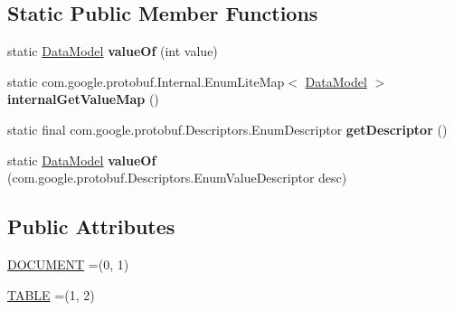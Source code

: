 \subsection*{Static Public Member Functions}
\begin{DoxyCompactItemize}
\item 
\mbox{\label{enumcom_1_1mysql_1_1cj_1_1x_1_1protobuf_1_1_mysqlx_crud_1_1_data_model_a7b57fd28cc3eccbbec24d4cf6f435469}} 
static \mbox{\hyperlink{enumcom_1_1mysql_1_1cj_1_1x_1_1protobuf_1_1_mysqlx_crud_1_1_data_model}{Data\+Model}} {\bfseries value\+Of} (int value)
\item 
\mbox{\label{enumcom_1_1mysql_1_1cj_1_1x_1_1protobuf_1_1_mysqlx_crud_1_1_data_model_ad955a3eeb396be25dc6ac79a17d3e9e0}} 
static com.\+google.\+protobuf.\+Internal.\+Enum\+Lite\+Map$<$ \mbox{\hyperlink{enumcom_1_1mysql_1_1cj_1_1x_1_1protobuf_1_1_mysqlx_crud_1_1_data_model}{Data\+Model}} $>$ {\bfseries internal\+Get\+Value\+Map} ()
\item 
\mbox{\label{enumcom_1_1mysql_1_1cj_1_1x_1_1protobuf_1_1_mysqlx_crud_1_1_data_model_a54ba897915bc10ff7d5467c89f6b3cf9}} 
static final com.\+google.\+protobuf.\+Descriptors.\+Enum\+Descriptor {\bfseries get\+Descriptor} ()
\item 
\mbox{\label{enumcom_1_1mysql_1_1cj_1_1x_1_1protobuf_1_1_mysqlx_crud_1_1_data_model_a9e26dbd6fe1c7ac6f4db5d839607ae9a}} 
static \mbox{\hyperlink{enumcom_1_1mysql_1_1cj_1_1x_1_1protobuf_1_1_mysqlx_crud_1_1_data_model}{Data\+Model}} {\bfseries value\+Of} (com.\+google.\+protobuf.\+Descriptors.\+Enum\+Value\+Descriptor desc)
\end{DoxyCompactItemize}
\subsection*{Public Attributes}
\begin{DoxyCompactItemize}
\item 
\mbox{\hyperlink{enumcom_1_1mysql_1_1cj_1_1x_1_1protobuf_1_1_mysqlx_crud_1_1_data_model_ae7a3238c10f1593f2b0f364281316b37}{D\+O\+C\+U\+M\+E\+NT}} =(0, 1)
\item 
\mbox{\hyperlink{enumcom_1_1mysql_1_1cj_1_1x_1_1protobuf_1_1_mysqlx_crud_1_1_data_model_ad95cdc4e7a6cdab7a79917719c92de93}{T\+A\+B\+LE}} =(1, 2)
\end{DoxyCompactItemize}

